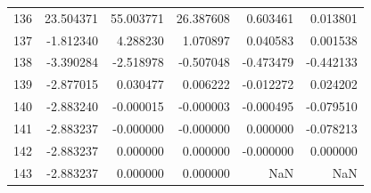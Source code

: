 \begin{tabular}{lrrrrr}
136 & 23.504371 & 55.003771 & 26.387608 & 0.603461 & 0.013801 \\
137 & -1.812340 & 4.288230 & 1.070897 & 0.040583 & 0.001538 \\
138 & -3.390284 & -2.518978 & -0.507048 & -0.473479 & -0.442133 \\
139 & -2.877015 & 0.030477 & 0.006222 & -0.012272 & 0.024202 \\
140 & -2.883240 & -0.000015 & -0.000003 & -0.000495 & -0.079510 \\
141 & -2.883237 & -0.000000 & -0.000000 & 0.000000 & -0.078213 \\
142 & -2.883237 & 0.000000 & 0.000000 & -0.000000 & 0.000000 \\
143 & -2.883237 & 0.000000 & 0.000000 & NaN & NaN \\
\bottomrule
\end{tabular}
